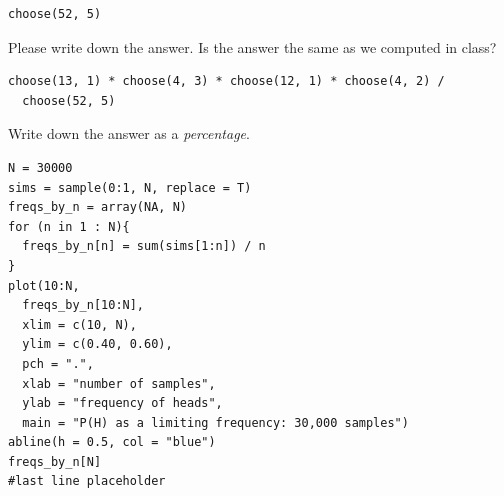 \documentclass[12pt]{article}
\begin{document}
\begin{enumerate}


\begin{knitrout}
\begin{kframe}
\begin{verbatim}
choose(52, 5)
\end{verbatim}
\end{kframe}
\end{knitrout}

Please write down the answer. Is the answer the same as we computed in class? 


\begin{knitrout}
\begin{kframe}
\begin{verbatim}
choose(13, 1) * choose(4, 3) * choose(12, 1) * choose(4, 2) / 
  choose(52, 5)
\end{verbatim}
\end{kframe}
\end{knitrout}

Write down the answer as a \textit{percentage}. 


\begin{knitrout}
\begin{kframe}
\begin{verbatim}
N = 30000
sims = sample(0:1, N, replace = T)
freqs_by_n = array(NA, N)
for (n in 1 : N){
  freqs_by_n[n] = sum(sims[1:n]) / n
}
plot(10:N, 
  freqs_by_n[10:N], 
  xlim = c(10, N), 
  ylim = c(0.40, 0.60), 
  pch = ".", 
  xlab = "number of samples",
  ylab = "frequency of heads",
  main = "P(H) as a limiting frequency: 30,000 samples")
abline(h = 0.5, col = "blue")
freqs_by_n[N]
#last line placeholder
\end{verbatim}
\end{kframe}
\end{knitrout}


\end{enumerate}
\end{document}
